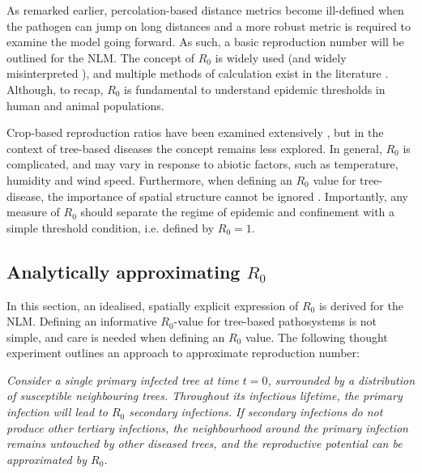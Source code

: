 As remarked earlier, percolation-based distance metrics become ill-defined when the pathogen can jump on long distances and a more robust metric is required to examine the model going forward.
As such, a basic reproduction number will be outlined for the NLM.
The concept of $R_0$ is widely used (and widely misinterpreted \cite{delamater2019complexity}),
and multiple methods of calculation exist in the literature \cite{perspectives-on-r0}.
Although, to recap, $R_0$ is fundamental to understand epidemic thresholds in human and animal populations. 

Crop-based reproduction ratios have been examined extensively
\cite{gubbins2000population, park2001invasion, doi:10.1146/annurev.phyto.011108.135838, van2011periodic},
but in the context of tree-based diseases the concept remains less explored. 
In general, $R_0$ is complicated, and may vary in response to abiotic factors, such as temperature, humidity and wind speed.
Furthermore, when defining an $R_0$ value for tree-disease, the importance of spatial structure cannot be
ignored \cite{park2001invasion}.
Importantly, any measure of $R_0$ should separate the regime of epidemic and confinement with a simple threshold condition, i.e. defined by $R_0=1$.


\subsection{Analytically approximating $R_0$}

In this section, an idealised, spatially explicit expression of $R_0$ is derived for the NLM. Defining an informative $R_0$-value for tree-based pathosystems is not simple, and care is needed when defining an $R_0$ value.  
The following thought experiment outlines an approach to approximate reproduction number:

\textit{Consider a single primary infected tree at time $t=0$, surrounded by a distribution of susceptible neighbouring trees. Throughout its infectious lifetime, the primary infection will lead to $R_0$ secondary infections. If secondary infections do not produce other tertiary infections, the neighbourhood around the primary infection remains untouched by other diseased trees, and the reproductive potential can be approximated by $R_0$.}

